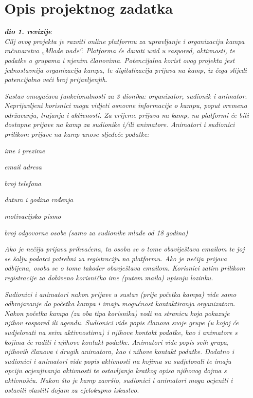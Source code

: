 \chapter{Opis projektnog zadatka}
		
		\textbf{\textit{dio 1. revizije}}\\
		
		\textit{Cilj ovog projekta je razviti online platformu za upravljanje i organizaciju kampa računarstva „Mlade nade“. Platforma će davati uvid u raspored, aktivnosti, te podatke o grupama i njenim članovima. Potencijalna korist ovog projekta jest jednostavnija organizacija kampa, te digitalizacija prijava na kamp, iz čega slijedi potencijalno veći broj prijavljenjih.}
		
		\textit{Sustav omogućava funkcionalnosti za 3 dionika: organizator, sudionik i animator. Neprijavljeni korisnici mogu vidjeti osnovne informacije o kampu, poput vremena održavanja, trajanja i aktivnosti. Za vrijeme prijava na kamp, na platformi će biti dostupne prijave na kamp za sudionike i/ili animatore. Animatori i sudionici prilikom prijave na kamp unose sljedeće podatke:}
		\begin{packed_item}
			\item \textit{ime i prezime}
			\item \textit{email adresa}
			\item \textit{broj telefona}
			\item \textit{datum i godina rođenja}
			\item \textit{motivacijsko pismo}
			\item \textit{broj odgovorne osobe (samo za sudionike mlađe od 18 godina)}
		\end{packed_item}
	
		\textit{Ako je nečija prijava prihvaćena, tu osobu se o tome obaviještava emailom te joj se šalju podatci potrebni za registraciju na platformu. Ako je nečija prijava odbijena, osoba se o tome također obavještava emailom. Korisnici zatim prilikom registracije za dobiveno korisničko ime (putem maila) upisuju lozinku.}
		
		\textit{Sudionici i animatori nakon prijave u sustav (prije početka kampa) vide samo odbrojavanje do početka kampa i imaju mogućnost kontaktiranja organizatora. Nakon početka kampa (za oba tipa korisnika) vodi na stranicu koja pokazuje njihov raspored ili agendu. Sudionici vide popis članova svoje grupe (u kojoj će sudjelovati na svim aktivnostima) i njihove kontakt podatke, kao i animatore s kojima će raditi i njihove kontakt podatke. Animatori vide popis svih grupa, njihovih članova i drugih animatora, kao i nihove kontakt podatke. Dodatno i sudionici i animatori vide popis aktivnosti na kojima su sudjelovali te imaju opciju ocjenjivanja aktivnosti te ostavljanja kratkog opisa njihovog dojma s aktivnošću. Nakon što je kamp završio, sudionici i animatori mogu ocjeniti i ostaviti vlastiti dojam za cjelokupno iskustvo. }
		
